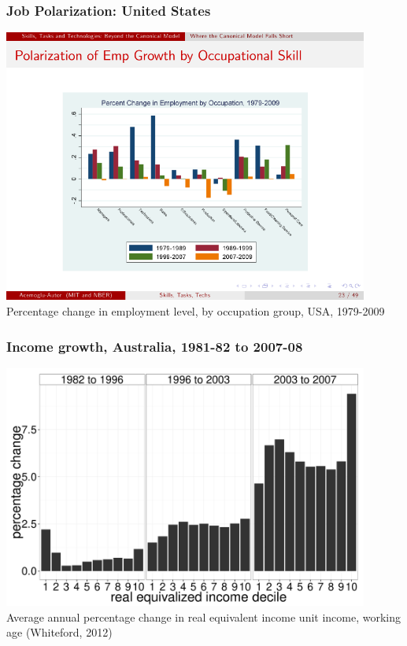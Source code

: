 \documentclass[red]{beamer}
\begin{document}
\begin{frame}
  \frametitle{Job Polarization: United States}
  \begin{center}
  \includegraphics[width=0.9\textwidth]{slides/level_by_occ.pdf} \\
  Percentage change in employment level, by occupation group, USA, 1979-2009 \citep{Acemoglu2011}
  \end{center}
\end{frame}

\begin{frame}
  \frametitle{Income growth, Australia, 1981-82 to 2007-08}
  \begin{center}
  \includegraphics[width=0.9\textwidth]{slides/figure_wage_deciles.pdf} \\
  Average annual percentage change in real equivalent income unit income, working age (Whiteford, 2012)
  \end{center}
\end{frame}
\end{document}
